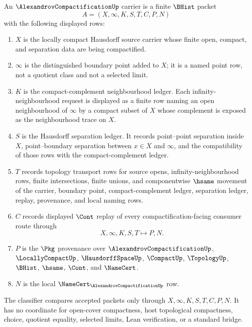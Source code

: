 \begin{definition}
\label{def:alexandrov-compactification-carrier}
An $\AlexandrovCompactificationUp$ carrier is a finite $\BHist$ packet
$$
A=(X,\infty,K,S,T,C,P,N)
$$
with the following displayed rows:
\begin{enumerate}
\item $X$ is the locally compact Hausdorff source carrier whose finite open, compact, and separation data are being compactified.
\item $\infty$ is the distinguished boundary point added to $X$; it is a named point row, not a quotient class and not a selected limit.
\item $K$ is the compact-complement neighbourhood ledger. Each infinity-neighbourhood request is displayed as a finite row naming an open neighbourhood of $\infty$ by a compact subset of $X$ whose complement is exposed as the neighbourhood trace on $X$.
\item $S$ is the Hausdorff separation ledger. It records point--point separation inside $X$, point--boundary separation between $x\in X$ and $\infty$, and the compatibility of those rows with the compact-complement ledger.
\item $T$ records topology transport rows for source opens, infinity-neighbourhood rows, finite intersections, finite unions, and componentwise $\hsame$ movement of the carrier, boundary point, compact-complement ledger, separation ledger, replay, provenance, and local naming rows.
\item $C$ records displayed $\Cont$ replay of every compactification-facing consumer route through
$$
X,\infty,K,S,T \longmapsto P,N .
$$
\item $P$ is the $\Pkg$ provenance over $\AlexandrovCompactificationUp$, $\LocallyCompactUp$, $\HausdorffSpaceUp$, $\CompactUp$, $\TopologyUp$, $\BHist$, $\hsame$, $\Cont$, and $\NameCert$.
\item $N$ is the local $\NameCert_{\AlexandrovCompactificationUp}$ row.
\end{enumerate}
The classifier compares accepted packets only through $X,\infty,K,S,T,C,P,N$. It has no coordinate for open-cover compactness, host topological compactness, choice, quotient equality, selected limits, Lean verification, or a standard bridge.
\end{definition}

